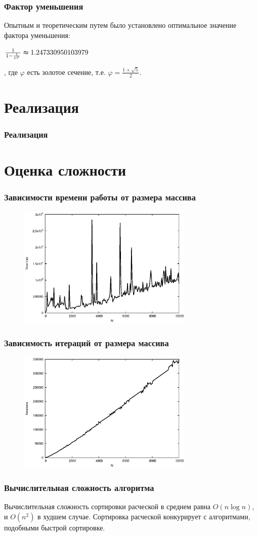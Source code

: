 \documentclass{beamer}
\newcommand{\br}{\pause \linebreak \linebreak}
\begin{document}
\begin{frame}
    \frametitle{Фактор уменьшения}
    Опытным и теоретическим путем было установлено оптимальное значение \alert{фактора уменьшения}:
    \begin{center}
        \Large $\frac{1}{1 - \frac1{e^{\varphi}}} \thickapprox 1.247330950103979$
    \end{center}
    , где $\varphi$ есть золотое сечение, т.е. $\varphi = \frac{1 + \sqrt{5}}2$.
\end{frame}

\section{Реализация}
\begin{frame}
    \frametitle{Реализация}
    
\end{frame}

\section{Оценка сложности}
\begin{frame}
    \frametitle{Зависимости времени работы от размера массива}
    \begin{figure}
        \center\includegraphics[width=3.3in]{g1}
    \end{figure}
\end{frame}
\begin{frame}
    \frametitle{Зависимость итераций от размера массива}
    \begin{figure}
        \center\includegraphics[width=3.3in]{g2}
    \end{figure}
\end{frame}
\begin{frame}
    \frametitle{Вычислительная сложность алгоритма}
    Вычислительная сложность сортировки расческой в среднем равна $O(n\log{n})$, и $O(n^2)$ в худшем случае.
    \br
    Сортировка расческой конкурирует с алгоритмами, подобными быстрой сортировке.
\end{frame}
\end{document}
